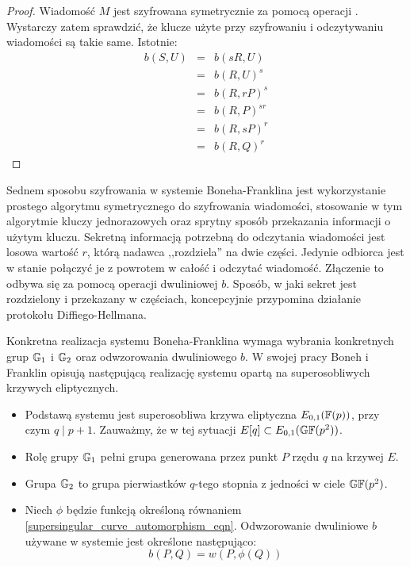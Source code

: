 \begin{proof}
Wiadomość $M$ jest szyfrowana symetrycznie za pomocą operacji .
Wystarczy zatem sprawdzić,
że klucze użyte przy szyfrowaniu i odczytywaniu wiadomości są takie same.
Istotnie:
\begin{eqnarray*}
b(S, U)
& = & b(sR, U) \\
& = & b(R, U)^s \\
& = & b(R, rP)^s \\
& = & b(R, P)^{sr} \\
& = & b(R, sP)^r \\
& = & b(R, Q)^r
\end{eqnarray*}
\end{proof}

\noindent
Sednem sposobu szyfrowania w systemie Boneha-Franklina
jest wykorzystanie prostego algorytmu symetrycznego do szyfrowania wiadomości,
stosowanie w tym algorytmie kluczy jednorazowych
oraz sprytny sposób przekazania informacji o użytym kluczu.
Sekretną informacją potrzebną do odczytania wiadomości
jest losowa wartość $r$, którą nadawca ,,rozdziela'' na dwie części.
Jedynie odbiorca jest w stanie połączyć je z powrotem w całość
i odczytać wiadomość.
Złączenie to odbywa się za pomocą operacji dwuliniowej $b$.
Sposób, w jaki sekret jest rozdzielony i przekazany w częściach,
koncepcyjnie przypomina działanie protokołu Diffiego-Hellmana.

\noindent
Konkretna realizacja systemu Boneha-Franklina
wymaga wybrania konkretnych grup $\mathbb{G}_1$ i $\mathbb{G}_2$
oraz odwzorowania dwuliniowego $b$.
W swojej pracy Boneh i Franklin opisują następującą realizację systemu
opartą na superosobliwych krzywych eliptycznych.
\begin{itemize}
\item
Podstawą systemu jest superosobliwa krzywa eliptyczna $E_{0,1}(\mathbb{F}(p))$,
przy czym $q \mid p+1$.
Zauważmy, że w tej sytuacji $E[q] \subset E_{0,1}(\mathbb{GF}(p^2))$.
\item
Rolę grupy $\mathbb{G}_1$ pełni grupa generowana
przez punkt $P$ rzędu $q$ na krzywej $E$.
\item
Grupa $\mathbb{G}_2$ to grupa pierwiastków $q$-tego stopnia z jedności
w ciele $\mathbb{GF}(p^2)$.
\item
Niech $\phi$ będzie funkcją określoną
równaniem \ref{supersingular_curve_automorphism_eqn}.
Odwzorowanie dwuliniowe $b$ używane w systemie
jest określone następująco:
\begin{equation}\label{modified_weil_pairing_eqn}
b(P, Q) = w(P, \phi(Q))
\end{equation}
\end{itemize}

